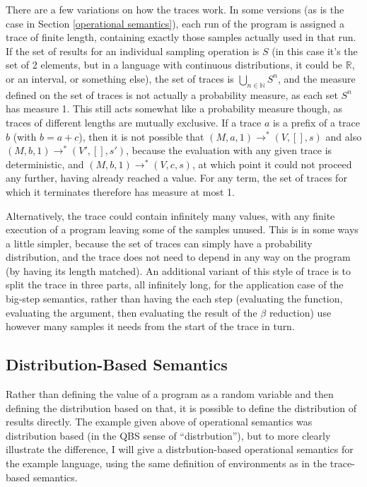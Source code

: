 \documentclass[titlepage]{article}
\begin{document}
There are a few variations on how the traces work. In some versions (as is the case in Section \ref{operational semantics}), each run of the program is assigned a trace of finite length, containing exactly those samples actually used in that run. If the set of results for an individual sampling operation is $S$ (in this case it's the set of 2 elements, but in a language with continuous distributions, it could be $\mathbb R$, or an interval, or something else), the set of traces is $\bigcup_{n \in \mathbb N} S^n$, and the measure defined on the set of traces is not actually a probability measure, as each set $S^n$ has measure 1. This still acts somewhat like a probability measure though, as traces of different lengths are mutually exclusive. If a trace $a$ is a prefix of a trace $b$ (with $b = a + c$), then it is not possible that $(M, a, 1) \to^* (V, [], s)$ and also $(M, b, 1) \to^* (V', [], s')$, because the evaluation with any given trace is deterministic, and $(M, b, 1) \to^* (V, c, s)$, at which point it could not proceed any further, having already reached a value. For any term, the set of traces for which it terminates therefore has measure at most 1.

Alternatively, the trace could contain infinitely many values, with any finite execution of a program leaving some of the samples unused. This is in some ways a little simpler, because the set of traces can simply have a probability distribution, and the trace does not need to depend in any way on the program (by having its length matched). An additional variant of this style of trace is to split the trace in three parts, all infinitely long, for the application case of the big-step semantics, rather than having the each step (evaluating the function, evaluating the argument, then evaluating the result of the $\beta$ reduction) use however many samples it needs from the start of the trace in turn.

\subsection{Distribution-Based Semantics}
Rather than defining the value of a program as a random variable and then defining the distribution based on that, it is possible to define the distribution of results directly. The example given above of operational semantics was distribution based (in the QBS sense of ``distrbution''), but to more clearly illustrate the difference, I will give a distrbution-based operational semantics for the example language, using the same definition of environments as in the trace-based semantics.
\end{document}
